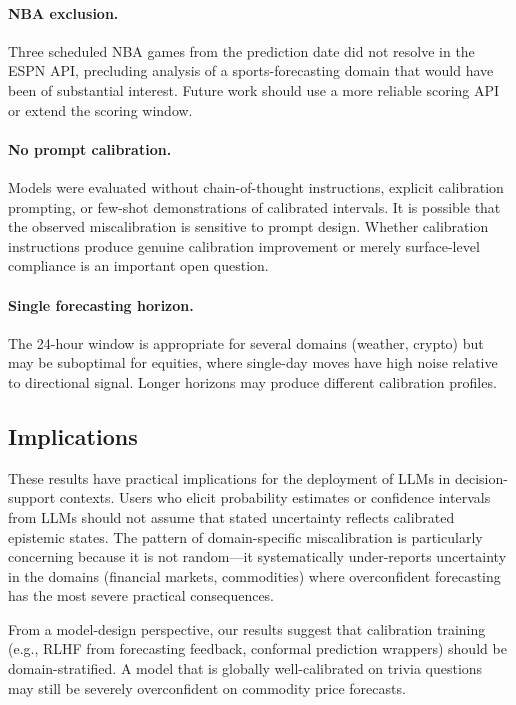 \documentclass[9pt,twoside,lineno]{pnas-new}
\begin{document}
\paragraph{NBA exclusion.} Three scheduled NBA games from the prediction date did not resolve in the ESPN API, precluding analysis of a sports-forecasting domain that would have been of substantial interest. Future work should use a more reliable scoring API or extend the scoring window.

\paragraph{No prompt calibration.} Models were evaluated without chain-of-thought instructions, explicit calibration prompting, or few-shot demonstrations of calibrated intervals. It is possible that the observed miscalibration is sensitive to prompt design. Whether calibration instructions produce genuine calibration improvement or merely surface-level compliance is an important open question.

\paragraph{Single forecasting horizon.} The 24-hour window is appropriate for several domains (weather, crypto) but may be suboptimal for equities, where single-day moves have high noise relative to directional signal. Longer horizons may produce different calibration profiles.

\subsection*{Implications}

These results have practical implications for the deployment of LLMs in decision-support contexts. Users who elicit probability estimates or confidence intervals from LLMs should not assume that stated uncertainty reflects calibrated epistemic states. The pattern of domain-specific miscalibration is particularly concerning because it is not random---it systematically under-reports uncertainty in the domains (financial markets, commodities) where overconfident forecasting has the most severe practical consequences.

From a model-design perspective, our results suggest that calibration training (e.g., RLHF from forecasting feedback, conformal prediction wrappers) should be domain-stratified. A model that is globally well-calibrated on trivia questions may still be severely overconfident on commodity price forecasts.
\end{document}
